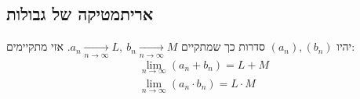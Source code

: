 \documentclass[11pt, oneside]{article}
\newcommand{\opr}[1]{\xrightarrow[\text{#1}]{}}
\begin{document}
\subsection*{אריתמטיקה של גבולות}
יהיו $(a_{n}), (b_{n})$ סדרות כך שמתקיים $a_{n} \opr{$n \to \infty$} L,\ b_{n} \opr{$n \to \infty$} M$. אזי מתקיימים:
\begin{eqnarray}
\lim_{n \to \infty} (a_{n} + b_{n}) = L + M\\
\lim_{n \to \infty} (a_{n} \cdot b_{n}) = L \cdot M
\end{eqnarray}
\end{document}
